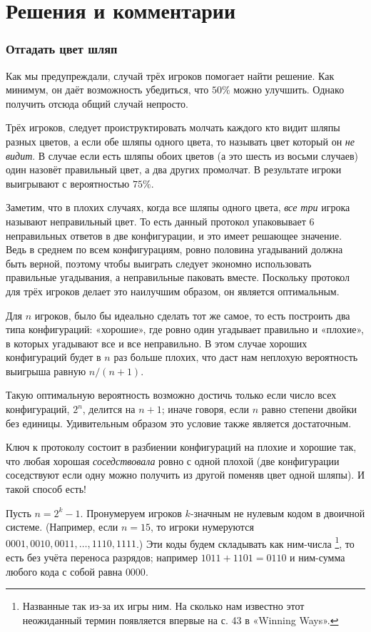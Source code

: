 \section*{Решения и комментарии}

\subsubsection*{Отгадать цвет шляп}

Как мы предупреждали, случай трёх игроков помогает найти решение.
Как минимум, он даёт возможность убедиться, что $50\%$ можно улучшить.
Однако получить отсюда общий случай непросто.

Трёх игроков, следует проиструктировать молчать каждого кто видит шляпы разных цветов,
а если обе шляпы одного цвета, то называть цвет который он \emph{не видит}.
В случае если есть шляпы обоих цветов (а это шесть из восьми случаев) один назовёт правильный цвет, а два других промолчат.
В результате игроки выигрывают с вероятностью $75\%$.

Заметим, что в плохих случаях, когда все шляпы одного цвета, \emph{все три} игрока называют неправильный цвет.
То есть данный протокол упаковывает 6 неправильных ответов в две конфигурации, и это имеет решающее значение.
Ведь в среднем по всем конфигурациям, ровно половина угадываний должна быть верной, поэтому чтобы выиграть следует экономно использовать правильные угадывания, а неправильные паковать вместе.
Поскольку протокол для трёх игроков делает это наилучшим образом, он является оптимальным.

Для $n$ игроков, было бы идеально сделать тот же самое,
то есть построить два типа конфигураций: «хорошие», где ровно один угадывает правильно и «плохие», в которых угадывают все и все неправильно.
В этом случае хороших конфигураций будет в $n$ раз больше плохих,
что даст нам неплохую вероятность выигрыша равную $n/(n+1)$.

Такую оптимальную вероятность возможно достичь только если число всех конфигураций, $2^n$, делится на $n+1$;
иначе говоря, если $n$ равно степени двойки без единицы.
Удивительным образом это условие также является достаточным.

Ключ к протоколу состоит в разбиении конфигураций на плохие и хорошие так, что любая хорошая \emph{соседствовала} ровно с одной плохой (две конфигурации соседствуют если одну можно получить из другой поменяв цвет одной шляпы).
И такой способ есть!

Пусть $n=2^k-1$.
Пронумеруем игроков $k$-значным не нулевым кодом в двоичной системе.
(Например, если $n=15$, то игроки нумеруются $0001,0010,0011,\dots,1110,1111$.)
Эти коды будем складывать как ним-числа%
\footnote{Названные так из-за их игры ним. На сколько нам известно этот неожиданный термин появляется впервые на с. 43 в «Winning Ways».}, то есть без учёта переноса разрядов;
например $1011 + 1101 =0110$ и ним-сумма любого кода с собой равна $0000$.

